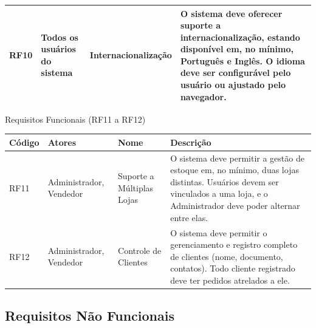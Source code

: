 \documentclass[
	12pt,				%
	openany,			%
	twoside,			%
	a4paper,			%
	english,			%
	brazil				%
	]{abntex2}
\begin{document}
\begin{quadro}[htb]
\begin{tabular}{|p{1.4cm}|p{2.8cm}|p{4.5cm}|p{7.0cm}|}
    RF10 & Todos os usuários do sistema & Internacionalização & O sistema deve oferecer suporte a internacionalização, estando disponível em, no mínimo, Português e Inglês. O idioma deve ser configurável pelo usuário ou ajustado pelo navegador. \\ \hline

    

    

    

\end{tabular}
\end{quadro}

\FloatBarrier

\begin{quadro}[htb]
\caption{\label{quadro_rf3}Requisitos Funcionais (RF11 a RF12)}
\hspace*{-1cm}
\begin{tabular}{|p{1.4cm}|p{2.8cm}|p{4.5cm}|p{7.0cm}|}
    \hline
    \textbf{Código} & \textbf{Atores} & \textbf{Nome} & \textbf{Descrição} \\ \hline

   RF11 & Administrador, Vendedor & Suporte a Múltiplas Lojas & O sistema deve permitir a gestão de estoque em, no mínimo, duas lojas distintas. Usuários devem ser vinculados a uma loja, e o Administrador deve poder alternar entre elas. \\ \hline

    RF12 & Administrador, Vendedor & Controle de Clientes & O sistema deve permitir o gerenciamento e registro completo de clientes (nome, documento, contatos). Todo cliente registrado deve ter pedidos atrelados a ele. \\ \hline


  

\end{tabular}
\end{quadro}

\FloatBarrier


\subsection{Requisitos Não Funcionais}
\end{document}
